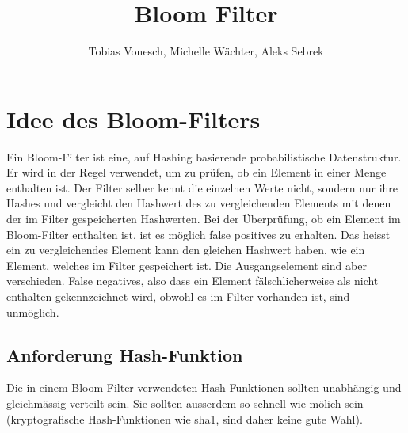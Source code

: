 \documentclass[11pt]{article}
\title{Bloom Filter}
\author{Tobias Vonesch, Michelle Wächter, Aleks Sebrek}
\begin{document}
    \maketitle

    \section{Idee des Bloom-Filters}

    Ein Bloom-Filter ist eine, auf Hashing basierende probabilistische Datenstruktur.
    Er wird in der Regel verwendet, um zu pr{\"u}fen, ob ein Element in einer Menge enthalten ist.
    Der Filter selber kennt die einzelnen Werte nicht, sondern nur ihre Hashes und vergleicht den Hashwert des zu vergleichenden Elements mit
    denen der im Filter gespeicherten Hashwerten.
    \newline
    Bei der {\"U}berpr{\"u}fung, ob ein Element im Bloom-Filter enthalten ist, ist es m{\"o}glich false positives zu erhalten.
    Das heisst ein zu vergleichendes Element kann den gleichen Hashwert haben, wie ein Element, welches im Filter gespeichert ist.
    Die Ausgangselement sind aber verschieden.
    \newline
    False negatives, also dass ein Element f{\"a}lschlicherweise als nicht enthalten gekennzeichnet wird,
    obwohl es im Filter vorhanden ist, sind unm{\"o}glich.

    \subsection{Anforderung Hash-Funktion}
    Die in einem Bloom-Filter verwendeten Hash-Funktionen sollten unabh{\"a}ngig und gleichm{\"a}ssig verteilt sein.
    Sie sollten ausserdem so schnell wie m{\"o}lich sein (kryptografische Hash-Funktionen wie sha1, sind daher keine gute Wahl).
\end{document}
